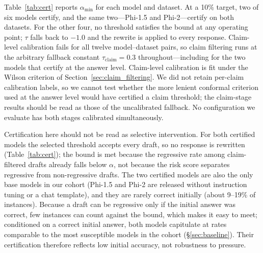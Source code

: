 \documentclass[sigconf, review, anonymous]{acmart}
\begin{document}
Table~\ref{tab:cert} reports $\alpha_{\min}$ for each model and dataset. At
a 10\% target, two of six models certify, and the same two---Phi-1.5 and
Phi-2---certify on both datasets. For the other four, no threshold satisfies
the bound at any operating point; $\tau$ falls back to $-1.0$ and the
rewrite is applied to every response. Claim-level calibration fails for all
twelve model--dataset pairs, so claim filtering runs at the arbitrary
fallback constant $\tau_{\text{claim}} = 0.3$ throughout---including for the
two models that certify at the answer level. Claim-level calibration is fit under the Wilson
criterion of Section~\ref{sec:claim_filtering}. We did not retain per-claim
calibration labels, so we cannot test whether the more lenient conformal
criterion used at the answer level would have certified a claim threshold;
the claim-stage results should be read as those of the uncalibrated
fallback. No configuration we evaluate
has both stages calibrated simultaneously.

Certification here should not be read as selective intervention. For both
certified models the selected threshold accepts every draft, so no response
is rewritten (Table~\ref{tab:cert}); the bound is met because the regressive
rate among claim-filtered drafts already falls below $\alpha$, not because
the risk score separates regressive from non-regressive drafts. The two
certified models are also the only base models in our cohort (Phi-1.5 and
Phi-2 are released without instruction tuning or a chat template), and they
are rarely correct initially (about 9--19\% of instances). Because a draft
can be regressive only if the initial answer was correct, few instances can
count against the bound, which makes it easy to meet; conditioned on a
correct initial answer, both models capitulate at rates comparable to the
most susceptible models in the cohort (\S\ref{sec:baseline}). Their
certification therefore reflects low initial accuracy, not robustness to
pressure.
\end{document}
